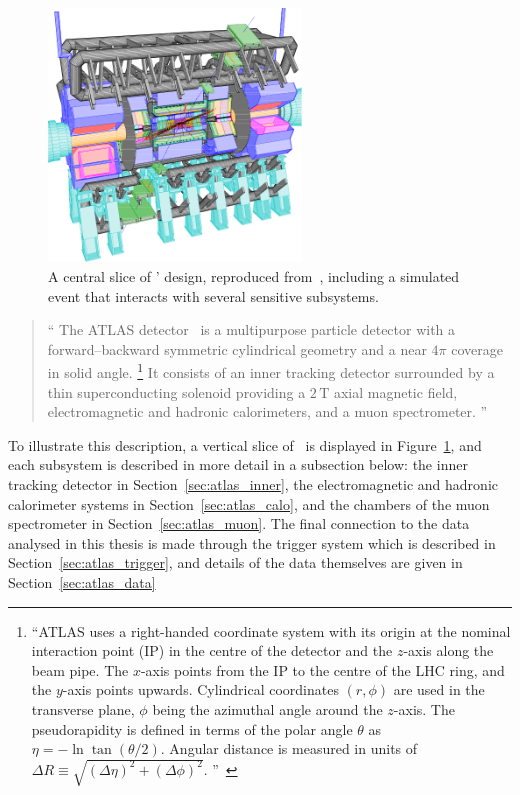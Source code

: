 \begin{figure}[tp]
\centering
\includegraphics[width=0.6\textwidth]{figures/atlas_cutaway_volume_1.pdf}
\caption[
A central slice of \atlas' design
]{%
A central slice of \atlas' design, reproduced from~\cite{atlas1999design1},
including a simulated event that interacts with several sensitive subsystems.
}
\label{fig:atlas_cutaway}
\end{figure}

\begin{quote}
``%
The ATLAS detector~\cite{PERF-2007-01} is a multipurpose particle detector with
a forward--backward symmetric cylindrical geometry and a near $4\pi$ coverage
in solid angle.%
\footnote{%
``ATLAS uses a right-handed coordinate system with its origin at the nominal
interaction point (IP) in the centre of the detector and the $z$-axis along the
beam pipe.
The $x$-axis points from the IP to the centre of the LHC ring, and the $y$-axis
points upwards.
Cylindrical coordinates $(r,\phi)$ are used in the transverse plane, $\phi$
being the azimuthal angle around the $z$-axis.
The pseudorapidity is defined in terms of the polar angle $\theta$ as
$\eta = -\ln \tan(\theta/2)$.
Angular distance is measured in units of
$\Delta R \equiv \sqrt{(\Delta\eta)^{2} + (\Delta\phi)^{2}}$.%
''\footnotemark~\cite{atlas2022searches}%
}
It consists of an inner tracking detector surrounded by a thin superconducting
solenoid providing a $2\,\mathrm{T}$ axial magnetic field, electromagnetic and
hadronic calorimeters, and a muon spectrometer.%
''~\cite{atlas2022searches}
\end{quote}
To illustrate this description, a vertical slice of \atlas\ is displayed in
Figure~\ref{fig:atlas_cutaway}, and each subsystem is described in more detail
in a subsection below:
the inner tracking detector in Section~\ref{sec:atlas_inner},
the electromagnetic and hadronic calorimeter systems in
Section~\ref{sec:atlas_calo},
and
the chambers of the muon spectrometer in Section~\ref{sec:atlas_muon}.
The final connection to the data analysed in this thesis is made through the
trigger system which is described in Section~\ref{sec:atlas_trigger},
and details of the data themselves are given in
Section~\ref{sec:atlas_data}

